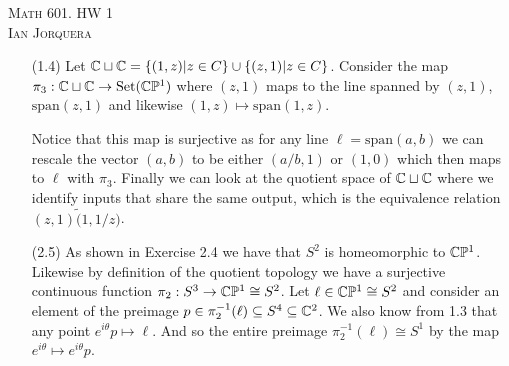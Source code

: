 \documentclass[12pt]{amsart}
\begin{document}
\begin{center}
    \textsc{Math 601. HW 1\\ Ian Jorquera}
\end{center}
\vspace{1em}
\begin{itemize}
\item[(1.4)] Let $\mathbb{C}\sqcup\mathbb{C}=\{(1,z) |z\in C\}\cup\{(z,1) |z\in C\}$. Consider the map 
             $\pi_3:\mathbb{C}\sqcup\mathbb{C}\rightarrow \text{Set}(\mathbb{C}\mathbb{P}^1)$ where $(z,1)$ maps to the line spanned by 
             $(z,1)$, $\text{span}{(z,1)}$
             and likewise $(1,z)\mapsto \text{span}{(1,z)}$. 
             
             Notice that this map is surjective as 
             for any line $\ell=\text{span}(a,b)$ 
             we can rescale the vector $(a,b)$ to be either $(a/b, 1)$ or $(1,0)$ which then maps to $\ell$ 
             with $\pi_3$. Finally we can look
             at the quotient space of $\mathbb{C}\sqcup\mathbb{C}$ where we identify inputs that share the same output, 
             which is the equivalence relation 
             $(z,1)\tilde (1,1/z)$.


\item[(2.5)] As shown in Exercise 2.4 we have that $S^2$ is homeomorphic to $\mathbb{C}\mathbb{P}^1$. 
             Likewise by definition of the quotient topology we have a surjective continuous 
             function $\pi_2:S^3\rightarrow\mathbb{C}\mathbb{P}^1\cong S^2$. Let $\ell\in \mathbb{C}\mathbb{P}^1\cong S^2$ and consider an element of the preimage 
             $p\in \pi_2^{-1}(\ell)\subseteq S^4\subseteq \mathbb{C}^2$. 
             We also know from 1.3 that any point $e^{i\theta}p\mapsto \ell$. And so the entire preimage 
             $\pi_2^{-1}(\ell)\cong S^1$ by the map $e^{i \theta}\mapsto e^{i \theta} p$.
\end{itemize}
\end{document}
